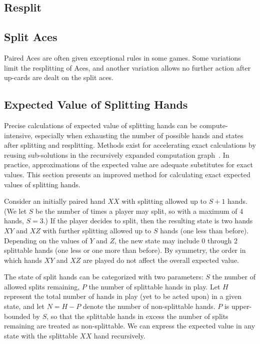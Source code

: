 
\subsection{Resplit}
\label{sec:basic:resplit}


\subsection{Split Aces}
\label{sec:basic:split-aces}

Paired Aces are often given exceptional rules in some games.
Some variations limit the resplitting of Aces, 
and another variation allows no further action after
up-cards are dealt on the split aces.  

\subsection{Expected Value of Splitting Hands}
\label{sec:basic:split:calc}

Precise calculations of expected value of splitting hands can be 
compute-intensive, especially when exhausting the number of 
possible hands and states after splitting and resplitting.
Methods exist for accelerating exact calculations by 
reusing sub-solutions in the recursively expanded 
computation graph~\cite{ref:nairn08}.
In practice, approximations of the expected value are adequate 
substitutes for exact values\cite{ref:griffin99}.  
This section presents an improved method for calculating exact 
expected values of splitting hands.

Consider an initially paired hand $XX$ with splitting allowed 
up to $S+1$ hands.
(We let $S$ be the number of times a player may split, 
so with a maximum of 4 hands, $S=3$.)
If the player decides to split, then the resulting state is
two hands $XY$ and $XZ$ with further splitting allowed up to $S$ hands 
(one less than before).  
Depending on the values of $Y$ and $Z$, the new state may include 
0 through 2 splittable hands (one less or one more than before).  
By symmetry, the order in which hands $XY$ and $XZ$ are played 
do not affect the overall expected value.  

The state of split hands can be categorized with two parameters:
$S$ the number of allowed splits remaining,
$P$ the number of splittable hands in play.
Let $H$ represent the total number of hands in play 
(yet to be acted upon) in a given state, 
and let $N=H-P$ denote the number of non-splittable hands.  
$P$ is upper-bounded by $S$, so that the splittable
hands in excess the number of splits remaining are treated 
as non-splittable.
We can express the expected value in any state
with the splittable $XX$ hand recursively.


